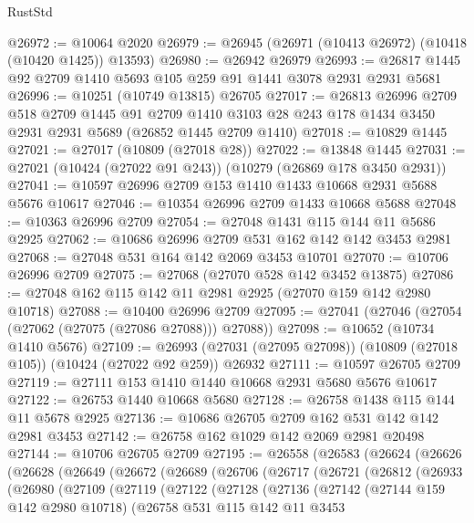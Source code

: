\begin{lexlean}{RustStd}
\begin{coremodule}
@26972 := @10064 @2020
@26979 := @26945 (@26971 (@10413 @26972) (@10418 (@10420 @1425)) @13593)
@26980 := @26942 @26979
@26993 := @26817 @1445 @92 @2709 @1410 @5693 @105 @259 @91 @1441 @3078 @2931 @2931 @5681
@26996 := @10251 (@10749 @13815) @26705
@27017 := @26813
    @26996
    @2709
    @518
    @2709
    @1445
    @91
    @2709
    @1410
    @3103
    @28
    @243
    @178
    @1434
    @3450
    @2931
    @2931
    @5689
    (@26852 @1445 @2709 @1410)
@27018 := @10829 @1445
@27021 := @27017 (@10809 (@27018 @28))
@27022 := @13848 @1445
@27031 := @27021 (@10424 (@27022 @91 @243)) (@10279 (@26869 @178 @3450 @2931))
@27041 := @10597 @26996 @2709 @153 @1410 @1433 @10668 @2931 @5688 @5676 @10617
@27046 := @10354 @26996 @2709 @1433 @10668 @5688
@27048 := @10363 @26996 @2709
@27054 := @27048 @1431 @115 @144 @11 @5686 @2925
@27062 := @10686 @26996 @2709 @531 @162 @142 @142 @3453 @2981
@27068 := @27048 @531 @164 @142 @2069 @3453 @10701
@27070 := @10706 @26996 @2709
@27075 := @27068 (@27070 @528 @142 @3452 @13875)
@27086 := @27048 @162 @115 @142 @11 @2981 @2925 (@27070 @159 @142 @2980 @10718)
@27088 := @10400 @26996 @2709
@27095 := @27041 (@27046 (@27054 (@27062 (@27075 (@27086 @27088))) @27088))
@27098 := @10652 (@10734 @1410 @5676)
@27109 := @26993 (@27031 (@27095 @27098)) (@10809 (@27018 @105)) (@10424 (@27022 @92 @259)) @26932
@27111 := @10597 @26705 @2709
@27119 := @27111 @153 @1410 @1440 @10668 @2931 @5680 @5676 @10617
@27122 := @26753 @1440 @10668 @5680
@27128 := @26758 @1438 @115 @144 @11 @5678 @2925
@27136 := @10686 @26705 @2709 @162 @531 @142 @142 @2981 @3453
@27142 := @26758 @162 @1029 @142 @2069 @2981 @20498
@27144 := @10706 @26705 @2709
@27195 := @26558
    (@26583
      (@26624
        (@26626
          (@26628
            (@26649
              (@26672
                (@26689
                  (@26706
                    (@26717
                      (@26721
                        (@26812
                          (@26933
                            (@26980
                              (@27109
                                (@27119
                                  (@27122
                                    (@27128
                                      (@27136
                                        (@27142
                                          (@27144 @159 @142 @2980 @10718)
                                          (@26758
                                            @531
                                            @115
                                            @142
                                            @11
                                            @3453

\end{coremodule}
\end{lexlean}
